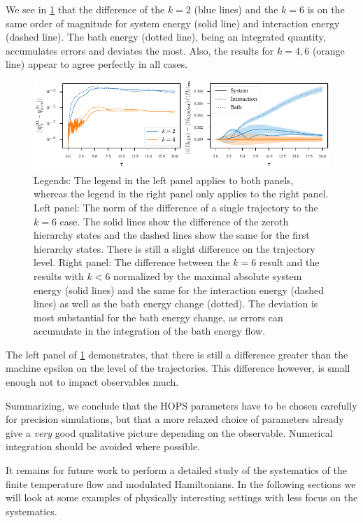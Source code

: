 We see in \cref{fig:k_systematics_system} that the difference of the
\(k = 2\) (blue lines) and the \(k = 6\) is on the same order of
magnitude for system energy (solid line) and interaction energy
(dashed line). The bath energy (dotted line), being an integrated
quantity, accumulates errors and deviates the most. Also, the results
for \(k = 4,6\) (orange line) appear to agree perfectly in all cases.
\begin{figure}[htp]
  \centering
  \includegraphics{figs/one_bath_syst/k_systematics_system}
  \caption{\label{fig:k_systematics_system} Legends: The legend in the
    left panel applies to both panels, whereas the legend in the right
    panel only applies to the right panel.  Left panel: The norm of the
    difference of a single trajectory to the \(k = 6\)
    case. The solid lines show the difference of the zeroth hierarchy
    states and the dashed lines show the same for the first hierarchy
    states.  There is still a slight difference on the trajectory
    level. Right panel: The difference between the \(k=6\) result and
    the results with \(k<6\) normalized by the maximal absolute system
    energy (solid lines) and the same for the interaction energy
    (dashed lines) as well as the bath energy change (dotted). The
    deviation is most substantial for the bath energy change, as
    errors can accumulate in the integration of the bath energy flow.}
\end{figure}
The left panel of \cref{fig:k_systematics_system} demonstrates, that
there is still a difference greater than the machine epsilon on the
level of the trajectories. This difference however, is small enough
not to impact observables much.

Summarizing, we conclude that the HOPS parameters have to be chosen
carefully for precision simulations, but that a more relaxed choice of
parameters already give a \emph{very} good qualitative picture
depending on the observable. Numerical integration should be avoided
where possible.

 It remains for future work
to perform a detailed study of the systematics of the finite
temperature flow and modulated Hamiltonians. In the following sections
we will look at some examples of physically interesting settings with
less focus on the systematics.

